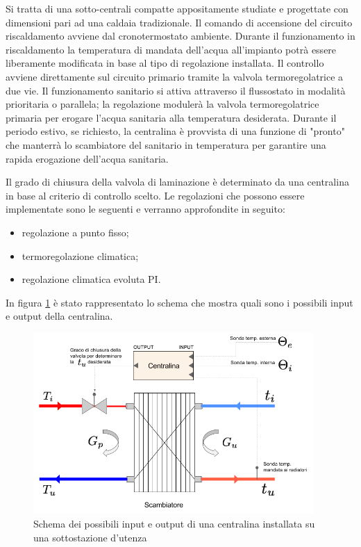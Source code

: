 \documentclass[laurea,oneside,11pt]{USiena_tesiLM}
\begin{document}
Si tratta di una sotto-centrali compatte appositamente studiate e progettate con dimensioni pari ad una caldaia tradizionale.
Il comando di accensione del circuito riscaldamento avviene dal cronotermostato ambiente. Durante il funzionamento in riscaldamento la temperatura di mandata dell'acqua all'impianto potrà essere liberamente modificata in base al tipo di regolazione installata. Il controllo  avviene direttamente sul circuito primario tramite la valvola termoregolatrice a due vie.
Il funzionamento sanitario si attiva attraverso il flussostato in modalità prioritaria o parallela; la regolazione modulerà la valvola termoregolatrice primaria per erogare l’acqua sanitaria alla temperatura desiderata.
Durante il periodo estivo, se richiesto, la centralina è provvista di una funzione di "pronto" che manterrà lo scambiatore del sanitario in temperatura per garantire una rapida erogazione dell'acqua sanitaria.

Il grado di chiusura della valvola di laminazione è determinato da una centralina in base al criterio di controllo scelto. Le regolazioni che possono essere implementate sono le seguenti e verranno approfondite in seguito:

\begin{itemize}
\item regolazione a punto fisso;
\item termoregolazione climatica;
\item regolazione climatica evoluta PI.
\end{itemize}  

In figura \ref{fig:schema_centralina} è stato rappresentato lo schema che mostra quali sono i possibili input e output della centralina.

\begin{figure}[!ht]
\centering
\includegraphics[width=0.95\textwidth]{figure/schema_centralina} 
\caption{Schema dei possibili input e output di una centralina installata su una sottostazione d'utenza}
\label{fig:schema_centralina}
\end{figure}
\end{document}
